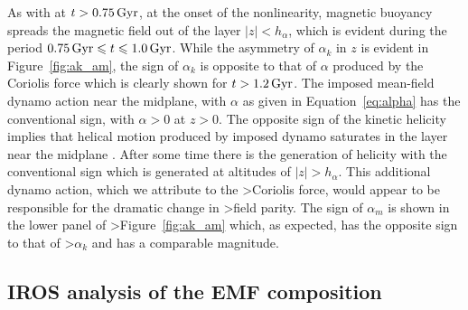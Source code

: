 \documentclass[fleqn,usenatbib]{mnras}
\newcommand{\Gyr}{\,{\rm Gyr}}  %
\begin{document}
As with \citet{QSTGB23} at $t>0.75\Gyr$, at the onset of the nonlinearity,
magnetic buoyancy spreads the magnetic field out of the layer $\lvert z \rvert<
h_{\alpha}$, which is evident during the period $0.75\Gyr\leq t\leq 1.0\Gyr$.
While the asymmetry of $\alpha_k$ in $z$  is evident in Figure~\ref{fig:ak_am},
the sign of $\alpha_k$ is opposite to that of $\alpha$ produced by the Coriolis
force which is clearly shown for $t>1.2\Gyr$.  The imposed mean-field dynamo
action near the midplane, with $\alpha$ as given in Equation~\ref{eq:alpha} has
the conventional sign, with $\alpha>0$ at $z>0$.  The opposite sign of the
kinetic helicity implies that helical motion produced by imposed dynamo
saturates in the layer near the midplane \citep[e.g., Section $7.11$
of][]{SS21}. After some time there is the generation of helicity with the
conventional sign which is generated at altitudes of $\lvert z\rvert
>h_{\alpha}$.  This additional dynamo action, which we attribute to the
>Coriolis force, {would appear to be} responsible for the dramatic change in
>field parity.  The sign of $\alpha_m$ is shown in the lower panel of
>Figure~\ref{fig:ak_am} which, as expected, has the opposite sign to that of
>$\alpha_k$ and {has} a comparable magnitude.

\subsection{IROS analysis of the EMF composition}\label{sec:emf}
\end{document}
